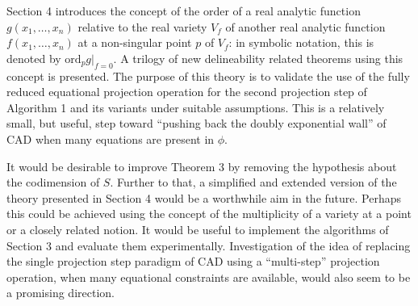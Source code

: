 \documentclass{article}
\begin{document}
Section 4 introduces the concept of the order of a real analytic function
$g(x_1, \ldots, x_n)$ relative to the real variety $V_f$
of another real analytic function
$f(x_1, \ldots, x_n)$ at a non-singular point $p$ of $V_f$: 
in symbolic notation, this is denoted by
$\mathrm{ord}_p g|_{f=0}$.
A trilogy of new delineability related theorems using this concept
is presented. The purpose of this theory is to validate the use
of the fully reduced equational projection operation for the
second projection step of Algorithm 1 and its variants 
under suitable assumptions.
This is a relatively small, but useful, step toward ``pushing back
the doubly exponential wall'' of CAD 
when many equations are present in $\phi$.

It would be desirable to improve Theorem 3 by removing the hypothesis
about the codimension of $S$. Further to that,
a simplified and extended version of the theory presented in Section 4
would be a worthwhile aim in the future.
Perhaps this could be achieved using the concept of the multiplicity
of a variety at a point or a closely related notion.
It would be useful to implement the algorithms of Section 3
and evaluate them experimentally.
Investigation of the idea of replacing 
the single projection step paradigm of CAD
using a ``multi-step'' projection operation,
when many equational constraints are available,
would also seem to be a promising direction.


\end{document}
